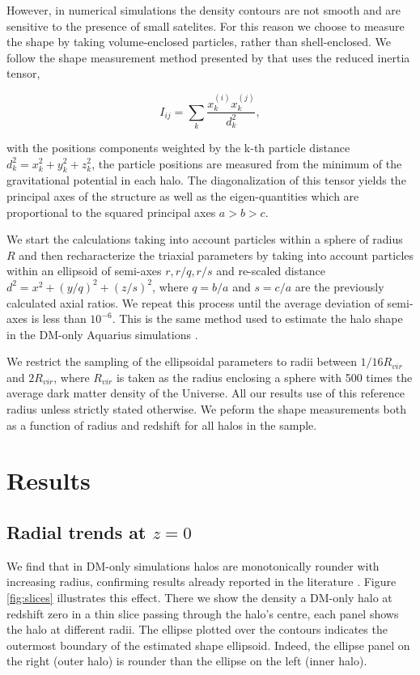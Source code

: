 \documentclass[a4paper,fleqn,usenatbib]{mnras}
\begin{document}
However, in numerical simulations the density contours are not smooth
and are sensitive to the presence of small satelites. 
For this reason we choose to measure the shape by taking
volume-enclosed particles, rather than shell-enclosed.  
We follow the shape measurement method presented by
\cite{Allgood_et_al._2006} that uses the reduced
inertia tensor,     

\begin{equation}
I_{ij} = \sum_k \frac{x_k^{(i)}x_k^{(j)}}{d^2_k},
\label{eq:inertia}
\end{equation}

with the positions components weighted by the k-th particle distance
$d_k^2=x_k^2+y_k^2+z_k^2$, the particle positions are measured from
the minimum of the gravitational potential in each halo.
The diagonalization of this tensor yields the principal axes of the
structure as well as the eigen-quantities which are proportional to
the squared principal axes $a>b>c$. 

We start the calculations taking into account particles within a
sphere of radius $R$ and then  recharacterize the triaxial parameters
by taking into account particles within an ellipsoid of semi-axes
$r,r/q,r/s$ and re-scaled distance $d^2=x^2+(y/q)^2+(z/s)^2$, where $q
= b/a$ and $s=c/a$ are the previously calculated axial ratios. 
We repeat this process until the average deviation of semi-axes is
less than $10^{-6}$.  
This is the same method used to estimate the halo shape in the DM-only
Aquarius simulations \citep{Vera-Ciro_et_al._2011}. 

We restrict the sampling of the ellipsoidal parameters to radii
between $1/16 R_{vir}$ and $2R_{vir}$, where  $R_{vir}$ is taken as the
radius enclosing a sphere with 500 times the average dark matter
density of the Universe. 
All our results use of this reference radius
unless strictly stated otherwise. 
We peform the shape measurements both as a function of radius and
redshift for all halos in the sample.


\section{Results}

\subsection{Radial trends at $z=0$}


We find that in DM-only simulations halos are monotonically rounder
with increasing radius, confirming results already reported in the
literature \citep{Vera-Ciro_et_al._2011}. 
Figure \ref{fig:slices} illustrates this effect.
There we show the density a DM-only halo at redshift zero in a thin
slice passing through the halo's centre, each panel shows the halo at
different radii.
The ellipse plotted over the contours indicates the outermost
boundary of the estimated shape ellipsoid. 
Indeed, the ellipse panel on the right (outer halo) is rounder than
the ellipse on the left (inner halo). 
\end{document}
